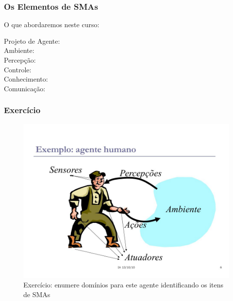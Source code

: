 \begin{frame}%

 \frametitle{Os Elementos de SMAs}
  
  \begin{block}{O que abordaremos neste curso:}
  
   \begin{description}
  
     \item[Projeto de Agente:] 
     
    \item[Ambiente:] 
          
   \item[Percepção:]
               
 \item[Controle:]
                    
  \item[Conhecimento:]
                          
  \item[Comunicação:]
          
   \end{description}
  \end{block}    
   
\end{frame}







\begin{frame}

\frametitle{Exercício}
   
\begin{figure}[!ht]
\centering
\includegraphics[height =.56\textheight,width=.7\textwidth]{figuras/agente_humano.jpg}
\caption{Exercício: enumere domínios para este agente identificando os itens de SMAs}
\end{figure}

   
\end{frame}



